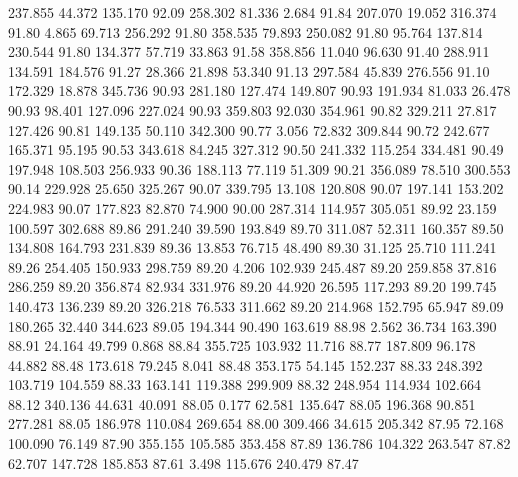  237.855   44.372  135.170        92.09
 258.302   81.336    2.684        91.84
 207.070   19.052  316.374        91.80
   4.865   69.713  256.292        91.80
 358.535   79.893  250.082        91.80
  95.764  137.814  230.544        91.80
 134.377   57.719   33.863        91.58
 358.856   11.040   96.630        91.40
 288.911  134.591  184.576        91.27
  28.366   21.898   53.340        91.13
 297.584   45.839  276.556        91.10
 172.329   18.878  345.736        90.93
 281.180  127.474  149.807        90.93
 191.934   81.033   26.478        90.93
  98.401  127.096  227.024        90.93
 359.803   92.030  354.961        90.82
 329.211   27.817  127.426        90.81
 149.135   50.110  342.300        90.77
   3.056   72.832  309.844        90.72
 242.677  165.371   95.195        90.53
 343.618   84.245  327.312        90.50
 241.332  115.254  334.481        90.49
 197.948  108.503  256.933        90.36
 188.113   77.119   51.309        90.21
 356.089   78.510  300.553        90.14
 229.928   25.650  325.267        90.07
 339.795   13.108  120.808        90.07
 197.141  153.202  224.983        90.07
 177.823   82.870   74.900        90.00
 287.314  114.957  305.051        89.92
  23.159  100.597  302.688        89.86
 291.240   39.590  193.849        89.70
 311.087   52.311  160.357        89.50
 134.808  164.793  231.839        89.36
  13.853   76.715   48.490        89.30
  31.125   25.710  111.241        89.26
 254.405  150.933  298.759        89.20
   4.206  102.939  245.487        89.20
 259.858   37.816  286.259        89.20
 356.874   82.934  331.976        89.20
  44.920   26.595  117.293        89.20
 199.745  140.473  136.239        89.20
 326.218   76.533  311.662        89.20
 214.968  152.795   65.947        89.09
 180.265   32.440  344.623        89.05
 194.344   90.490  163.619        88.98
   2.562   36.734  163.390        88.91
  24.164   49.799    0.868        88.84
 355.725  103.932   11.716        88.77
 187.809   96.178   44.882        88.48
 173.618   79.245    8.041        88.48
 353.175   54.145  152.237        88.33
 248.392  103.719  104.559        88.33
 163.141  119.388  299.909        88.32
 248.954  114.934  102.664        88.12
 340.136   44.631   40.091        88.05
   0.177   62.581  135.647        88.05
 196.368   90.851  277.281        88.05
 186.978  110.084  269.654        88.00
 309.466   34.615  205.342        87.95
  72.168  100.090   76.149        87.90
 355.155  105.585  353.458        87.89
 136.786  104.322  263.547        87.82
  62.707  147.728  185.853        87.61
   3.498  115.676  240.479        87.47
